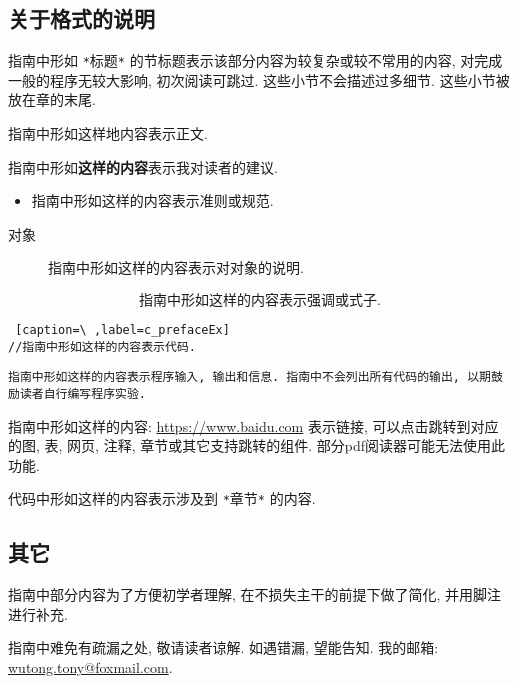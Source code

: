     \vspace*{5pt}

    \subsection*{关于格式的说明}

    指南中形如 \texttt{*}标题\texttt{*} 的节标题表示该部分内容为较复杂或较不常用的内容, 对完成一般的程序无较大影响, 初次阅读可跳过. 这些小节不会描述过多细节. 这些小节被放在章的末尾.

    \vspace*{5pt}
    指南中形如这样地内容表示正文. 

    \vspace*{5pt}
    指南中形如\textbf{这样的内容}表示我对读者的建议.

    \begin{itemize}
        \item 指南中形如这样的内容表示准则或规范.
    \end{itemize}

    \begin{description}
        \item[对象] 指南中形如这样的内容表示对对象的说明. 
    \end{description}

    \vspace*{-20pt}
        \[ \mbox{指南中形如这样的内容表示强调或式子.} \]

\begin{lstlisting} [caption=\ ,label=c_prefaceEx]
//指南中形如这样的内容表示代码.
\end{lstlisting}


\begin{lstlisting}
指南中形如这样的内容表示程序输入, 输出和信息. 指南中不会列出所有代码的输出, 以期鼓励读者自行编写程序实验.
\end{lstlisting}

    \vspace*{5pt}
    指南中形如这样的内容: \href{https://www.baidu.com}{https://www.baidu.com} 表示链接, 可以点击跳转到对应的图, 表, 网页, 注释, 章节或其它支持跳转的组件. 部分pdf阅读器可能无法使用此功能.

    \begin{mdframed}[linecolor=darkgray]
        代码中形如这样的内容表示涉及到 \texttt{*}章节\texttt{*} 的内容.
    \end{mdframed}

    \subsection*{其它}

    指南中部分内容为了方便初学者理解, 在不损失主干的前提下做了简化, 并用脚注进行补充.

    指南中难免有疏漏之处, 敬请读者谅解. 如遇错漏, 望能告知. 我的邮箱: \mbox{\href{mailto: wutong.tony@foxmail.com}{wutong.tony@foxmail.com}}.